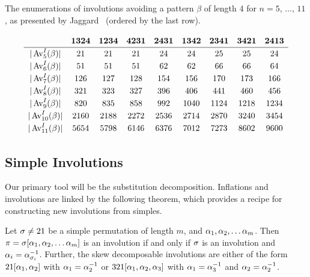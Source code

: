     
    \begin{table}[t]
    \caption[The enumeration of involutions avoiding a pattern]{The
              enumerations of involutions avoiding a pattern $\beta$ of length
              $4$ for $n=5$, $\dots$, $11$, as presented by
              Jaggard~\cite{Jaggard2002} (ordered by the last row).}
    \label{involutions:tab:Jaggard}
      $$
      \begin{array}{ccccccccc}%
      &&&&&&&&\\[-10pt]
      &\bm{1324}&\bm{1234}&\bm{4231}&\bm{2431}&\bm{1342}&\bm{2341}&\bm{3421}&\bm{2413}\\[1pt]
      \hline
      &&&&&&&&\\[-11pt]
      |\Av^I_{5}(\beta)|&21&21&21&24&24&25&25&24\\[1pt]
      &&&&&&&&\\[-11pt]
      |\Av^I_{6}(\beta)|&51&51&51&62&62&66&66&64\\[1pt]
      &&&&&&&&\\[-11pt]
      |\Av^I_{7}(\beta)|&126&127&128&154&156&170&173&166\\[1pt]
      &&&&&&&&\\[-11pt]
      |\Av^I_{8}(\beta)|&321&323&327&396&406&441&460&456\\[1pt]
      &&&&&&&&\\[-11pt]
      |\Av^I_{9}(\beta)|&820&835&858&992&1040&1124&1218&1234\\[1pt]
      &&&&&&&&\\[-11pt]
      |\Av^I_{10}(\beta)|&2160&2188&2272&2536&2714&2870&3240&3454\\[1pt]
      &&&&&&&&\\[-11pt]
      |\Av^I_{11}(\beta)|&5654&5798&6146&6376&7012&7273&8602&9600\\[1pt]
      \end{array}
      $$
    \end{table}


  \subsection{Simple Involutions}

    Our primary tool will be the substitution decomposition. Inflations and
    involutions are linked by the following theorem, which provides a recipe
    for constructing new involutions from simples. 

    \begin{theorem}
      \label{thm:subsdecomp-inv}
      Let $\sigma \neq 21$ be a simple permutation of length $m$, and $\alpha_1, 
      \alpha_2, \dots \alpha_m$. Then $\pi = \sigma[\alpha_1, \alpha_2, \dots \alpha_m]$ is
      an involution if and only if $\sigma$ is an involution and $\alpha_i =
      \alpha_{\sigma_i}^{-1}$. 
      Further, the skew decomposable involutions are either of the form
      $21[\alpha_1, \alpha_2]$ with $\alpha_1 = \alpha_2^{-1}$ or $321[\alpha_1, \alpha_2,
      \alpha_3]$ with $\alpha_1 = \alpha_3^{-1}$ and $\alpha_2 = \alpha_2^{-1}$. 
    \end{theorem}

